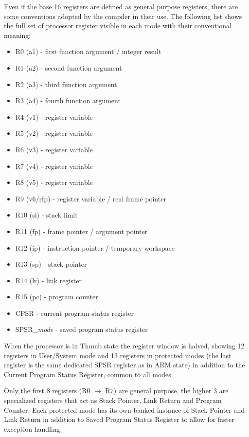 Even if the base 16 registers are defined as general purpose registers, there are some conventions adopted by the compiler in their use. The following list shows the full set of processor register visible in each mode with their conventional meaning:

\begin{itemize}
\item R0 (a1) - first function argument / integer result
\item R1 (a2) - second function argument
\item R2 (a3) - third function argument
\item R3 (a4) - fourth function argument
\item R4 (v1) - register variable
\item R5 (v2) - register variable
\item R6 (v3) - register variable
\item R7 (v4) - register variable
\item R8 (v5) - register variable
\item R9 (v6/rfp) - register variable / real frame pointer
\item R10 (sl) - stack limit
\item R11 (fp) - frame pointer / argument pointer
\item R12 (ip) - instruction pointer / temporary workspace
\item R13 (sp) - stack pointer
\item R14 (lr) - link register
\item R15 (pc) - program counter
\item CPSR - current program status register
\item SPSR\_\emph{mode} - saved program status register
\end{itemize}

When the processor is in Thumb state the register window is halved, showing 12 registers in User/System mode and 13 registers in protected modes (the last register is the same dedicated SPSR register as in ARM state) in addition to the Current Program Status Register, common to all modes. 

Only the first 8 registers (R0 $\rightarrow$ R7) are general purpose, the higher 3 are specialized registers that act as Stack Pointer, Link Return and Program Counter. Each protected mode has its own banked instance of Stack Pointer and Link Return in addition to Saved Program Status Register to allow for faster exception handling. 

